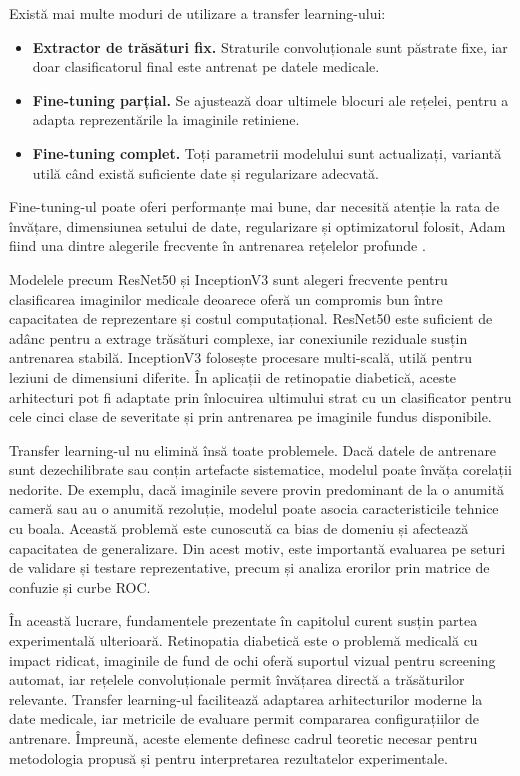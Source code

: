 \documentclass[12pt, a4paper, oneside, romanian]{teza-upb}
\begin{document}
Există mai multe moduri de utilizare a transfer learning-ului:

\begin{itemize}
  \item \textbf{Extractor de trăsături fix.} Straturile convoluționale sunt păstrate fixe, iar doar clasificatorul final este antrenat pe datele medicale.
  \item \textbf{Fine-tuning parțial.} Se ajustează doar ultimele blocuri ale rețelei, pentru a adapta reprezentările la imaginile retiniene.
  \item \textbf{Fine-tuning complet.} Toți parametrii modelului sunt actualizați, variantă utilă când există suficiente date și regularizare adecvată.
\end{itemize}

Fine-tuning-ul poate oferi performanțe mai bune, dar necesită atenție la rata de învățare, dimensiunea setului de date, regularizare și optimizatorul folosit, Adam fiind una dintre alegerile frecvente în antrenarea rețelelor profunde \cite{23_kingma2014adam}.
\bigskip

Modelele precum ResNet50 și InceptionV3 sunt alegeri frecvente pentru clasificarea imaginilor medicale deoarece oferă un compromis bun între capacitatea de reprezentare și costul computațional. ResNet50 este suficient de adânc pentru a extrage trăsături complexe, iar conexiunile reziduale susțin antrenarea stabilă. InceptionV3 folosește procesare multi-scală, utilă pentru leziuni de dimensiuni diferite. În aplicații de retinopatie diabetică, aceste arhitecturi pot fi adaptate prin înlocuirea ultimului strat cu un clasificator pentru cele cinci clase de severitate și prin antrenarea pe imaginile fundus disponibile.
\bigskip

Transfer learning-ul nu elimină însă toate problemele. Dacă datele de antrenare sunt dezechilibrate sau conțin artefacte sistematice, modelul poate învăța corelații nedorite. De exemplu, dacă imaginile severe provin predominant de la o anumită cameră sau au o anumită rezoluție, modelul poate asocia caracteristicile tehnice cu boala. Această problemă este cunoscută ca bias de domeniu și afectează capacitatea de generalizare. Din acest motiv, este importantă evaluarea pe seturi de validare și testare reprezentative, precum și analiza erorilor prin matrice de confuzie și curbe ROC.
\bigskip

În această lucrare, fundamentele prezentate în capitolul curent susțin partea experimentală ulterioară. Retinopatia diabetică este o problemă medicală cu impact ridicat, imaginile de fund de ochi oferă suportul vizual pentru screening automat, iar rețelele convoluționale permit învățarea directă a trăsăturilor relevante. Transfer learning-ul facilitează adaptarea arhitecturilor moderne la date medicale, iar metricile de evaluare permit compararea configurațiilor de antrenare. Împreună, aceste elemente definesc cadrul teoretic necesar pentru metodologia propusă și pentru interpretarea rezultatelor experimentale.
\end{document}
